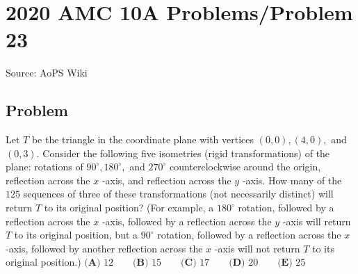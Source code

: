 \documentclass[12pt]{article}
\begin{document}
\section*{{2020 AMC 10A Problems/Problem 23}}
Source: AoPS Wiki

\subsection*{Problem}
Let $T$ be the triangle in the coordinate plane with vertices $(0,0), (4,0),$ and $(0,3).$ Consider the following five isometries (rigid transformations) of the plane: rotations of $90^{\circ}, 180^{\circ},$ and $270^{\circ}$ counterclockwise around the origin, reflection across the $x$ -axis, and reflection across the $y$ -axis. How many of the $125$ sequences of three of these transformations (not necessarily distinct) will return $T$ to its original position? (For example, a $180^{\circ}$ rotation, followed by a reflection across the $x$ -axis, followed by a reflection across the $y$ -axis will return $T$ to its original position, but a $90^{\circ}$ rotation, followed by a reflection across the $x$ -axis, followed by another reflection across the $x$ -axis will not return $T$ to its original position.) $\textbf{(A) } 12 \qquad \textbf{(B) } 15 \qquad \textbf{(C) } 17 \qquad \textbf{(D) } 20 \qquad \textbf{(E) } 25$
\end{document}
